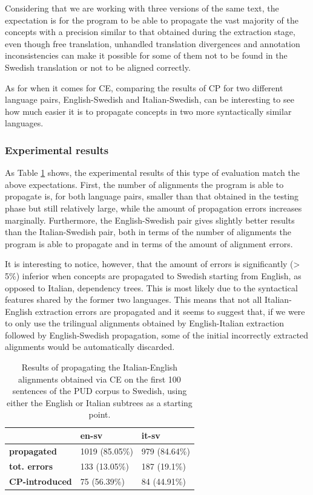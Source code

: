 Considering that we are working with three versions of the same text, the expectation is for the program to be able to propagate the vast majority of the concepts with a precision similar to that obtained during the extraction stage, even though free translation, unhandled translation divergences and annotation inconsistencies can make it possible for some of them not to be found in the Swedish translation or not to be aligned correctly. \smallskip

As for when it comes for CE, comparing the results of CP for two different language pairs, English-Swedish and Italian-Swedish, can be interesting to see how much easier it is to propagate concepts in two more syntactically similar languages.

\subsubsection{Experimental results}
As Table \ref{tcp1} shows, the experimental results of this type of evaluation match the above expectations. First, the number of alignments the program is able to propagate is, for both language pairs, smaller than that obtained in the testing phase but still relatively large, while the amount of propagation errors increases marginally. Furthermore, the English-Swedish pair gives slightly better results than the Italian-Swedish pair, both in terms of the number of alignments the program is able to propagate and in terms of the amount of alignment errors. \smallskip

It is interesting to notice, however, that the amount of errors is significantly (> 5\%) inferior when concepts are propagated to Swedish starting from English, as opposed to Italian, dependency trees. This is most likely due to the syntactical features shared by the former two languages. This means that not all Italian-English extraction errors are propagated and it seems to suggest that, if we were to only use the trilingual alignments obtained by English-Italian extraction followed by English-Swedish propagation, some of the initial incorrectly extracted alignments would be automatically discarded.

\begin{table}[H]
    \centering
    \begin{tabular}{|l|l|l|}
    \hline
    \textbf{}              & \textbf{en-sv} & \textbf{it-sv} \\ \hline
    \textbf{propagated}             & 1019 (85.05\%) & 979 (84.64\%) \\ \hline
    \textbf{tot. errors}            & 133 (13.05\%)  & 187 (19.1\%)  \\ \hline
    \textbf{CP-introduced}          & 75 (56.39\%)   & 84 (44.91\%)   \\ \hline
    \end{tabular}
    \caption[Performance of CP Scenario 1 on manually annotated data]{Results of propagating the Italian-English alignments obtained via CE on the first 100 sentences of the PUD corpus to Swedish, using either the English or Italian subtrees as a starting point.}
    \label{tcp1}
    \end{table}

